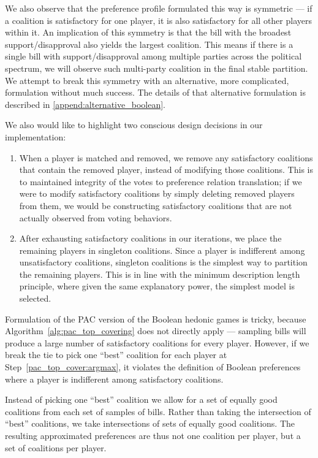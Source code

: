 We also observe that the preference profile formulated this way is symmetric ---
if a coalition is satisfactory for one player, it is also satisfactory for all
other players within it.
An implication of this symmetry is that the bill with the broadest
support/disapproval also yields the largest coalition.
This means if there is a single bill with support/disapproval among multiple
parties across the political spectrum, we will observe such multi-party
coalition in the final stable partition.
We attempt to break this symmetry with an alternative, more complicated,
formulation without much success.
The details of that alternative formulation is described in
\autoref{append:alternative_boolean}.

We also would like to highlight two conscious design decisions in our
implementation:

\begin{enumerate}
  \item When a player is matched and removed, we remove any satisfactory
    coalitions that contain the removed player, instead of modifying those
    coalitions.
    This is to maintained integrity of the votes to preference relation
    translation; if we were to modify satisfactory coalitions by simply
    deleting removed players from them, we would be constructing satisfactory
    coalitions that are not actually observed from voting behaviors.
  \item After exhausting satisfactory coalitions in our iterations, we place
    the remaining players in singleton coalitions.
    Since a player is indifferent among unsatisfactory coalitions, singleton
    coalitions is the simplest way to partition the remaining players.
    This is in line with the minimum description length principle, where given
    the same explanatory power, the simplest model is selected.
\end{enumerate}

Formulation of the PAC version of the Boolean hedonic games is tricky, because
Algorithm~\ref{alg:pac_top_covering} does not directly apply --- sampling bills
will produce a large number of satisfactory coalitions for every player.
However, if we break the tie to pick one ``best'' coalition for each player at
Step~\ref{pac_top_cover:argmax}, it violates the definition of Boolean
preferences where a player is indifferent among satisfactory coalitions.

Instead of picking one ``best'' coalition we allow for a set of equally good
coalitions from each set of samples of bills.
Rather than taking the intersection of ``best'' coalitions, we take intersections
of sets of equally good coalitions.
The resulting approximated preferences are thus not one coalition per player,
but a set of coalitions per player.

